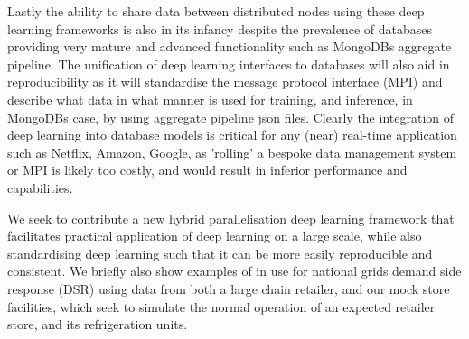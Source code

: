 Lastly the ability to share data between distributed nodes using these deep learning frameworks is also in its infancy despite the prevalence of databases providing very mature and advanced functionality such as MongoDBs aggregate pipeline. The unification of deep learning interfaces to databases will also aid in reproducibility as it will standardise the message protocol interface (MPI) and describe what data in what manner is used for training, and inference, in MongoDBs case, by using aggregate pipeline json files. Clearly the integration of deep learning into database models is critical for any (near) real-time application such as Netflix, Amazon, Google, as 'rolling' a bespoke data management system or MPI is likely too costly, and would result in inferior performance and capabilities.\par

We seek to contribute a new hybrid parallelisation deep learning framework that facilitates practical application of deep learning on a large scale, while also standardising deep learning such that it can be more easily reproducible and consistent. We briefly also show examples of \pfName in use for national grids demand side response (DSR) using data from both a large chain retailer, and our mock store facilities, which seek to simulate the normal operation of an expected retailer store, and its refrigeration units. \clearpage